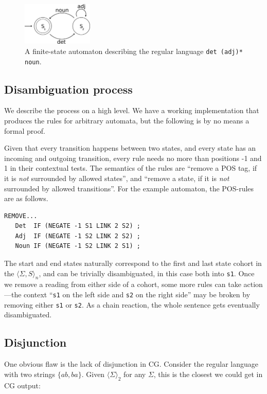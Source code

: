 \documentclass[11pt]{article}
\def\t#1{\texttt{#1}}
\def\maxAmb#1{$\langle \Sigma \rangle_#1$}
\def\maxAmbFSA#1{$\langle \Sigma,S \rangle_#1$}
\begin{document}
\begin{figure}[t]
  \centering
    \includegraphics[width=0.3\textwidth]{fsa.png}
  \caption{A finite-state automaton describing the regular language \t{det (adj)* noun}.}
 \label{fig:fsa}
\end{figure}


\subsection{Disambiguation process}

We describe the process on a high level. We have a working implementation that
produces the rules for arbitrary automata, but the following is by no means a formal proof.

Given that every transition happens between two states, and every state 
has an incoming and outgoing transition, every rule needs no more than
positions -1 and 1 in their contextual tests. 
The semantics of the rules are ``remove a POS tag, if it is \emph{not} surrounded by allowed states'',
and ``remove a state, if it is \emph{not} surrounded by allowed transitions''.
For the example automaton, the POS-rules are as follows.

\begin{verbatim}
REMOVE...
   Det  IF (NEGATE -1 S1 LINK 2 S2) ;
   Adj  IF (NEGATE -1 S2 LINK 2 S2) ;
   Noun IF (NEGATE -1 S2 LINK 2 S1) ;
\end{verbatim}

The start and end states naturally correspond to the first and last state cohort 
in the \maxAmbFSA{n}, and can be trivially disambiguated, in this case both into \t{s1}.
Once we remove a reading from either side of a cohort, some more rules 
can take action---the context ``\t{s1} on the left side and \t{s2} on the right side''
may be broken by removing either \t{s1} or \t{s2}.
As a chain reaction, the whole sentence gets eventually disambiguated.

\subsection{Disjunction}

One obvious flaw is the lack of disjunction in CG. Consider the regular 
language with two strings $\{ab,ba\}$. Given \maxAmb{2} for any $\Sigma$,
this is the closest we could get in CG output:
\end{document}
